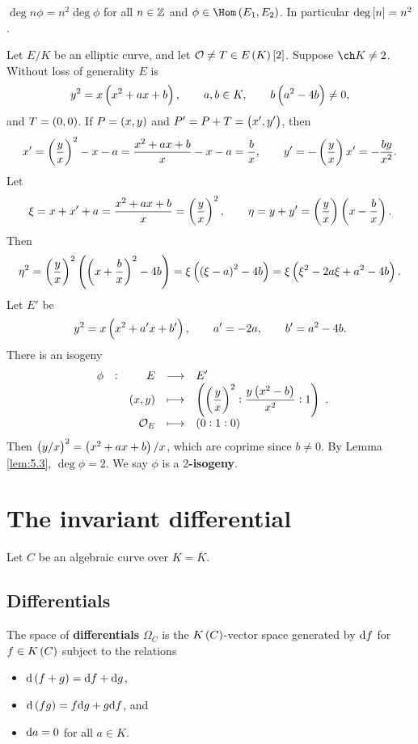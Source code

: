 \begin{corollary}
\label{cor:5.8}
$ \deg n\phi = n^2\deg \phi $ for all $ n \in \mathbb{Z} $ and $ \phi \in \Hom\br{E_1, E_2} $. In particular $ \deg \sbr{n} = n^2 $.
\end{corollary}

\pagebreak

\begin{example}
Let $ E / K $ be an elliptic curve, and let $ \OOO \ne T \in E\br{K}\sbr{2} $. Suppose $ \ch K \ne 2 $. Without loss of generality $ E $ is
$$ y^2 = x\br{x^2 + ax + b}, \qquad a, b \in K, \qquad b\br{a^2 - 4b} \ne 0, $$
and $ T = \br{0, 0} $. If $ P = \br{x, y} $ and $ P' = P + T = \br{x', y'} $, then
$$ x' = \br{\dfrac{y}{x}}^2 - x - a = \dfrac{x^2 + ax + b}{x} - x - a = \dfrac{b}{x}, \qquad y' = -\br{\dfrac{y}{x}}x' = -\dfrac{by}{x^2}. $$
Let
$$ \xi = x + x' + a = \dfrac{x^2 + ax + b}{x} = \br{\dfrac{y}{x}}^2, \qquad \eta = y + y' = \br{\dfrac{y}{x}}\br{x - \dfrac{b}{x}}. $$
Then
$$ \eta^2 = \br{\dfrac{y}{x}}^2\br{\br{x + \dfrac{b}{x}}^2 - 4b} = \xi\br{\br{\xi - a}^2 - 4b} = \xi\br{\xi^2 - 2a\xi + a^2 - 4b}. $$
Let $ E' $ be
$$ y^2 = x\br{x^2 + a'x + b'}, \qquad a' = -2a, \qquad b' = a^2 - 4b. $$
There is an isogeny
$$ \functions[\phi]{E}{E'}{\br{x, y}}{\br{\br{\dfrac{y}{x}}^2 : \dfrac{y\br{x^2 - b}}{x^2} : 1}}{\OOO_E}{\br{0 : 1 : 0}}. $$
Then $ \br{y / x}^2 = \br{x^2 + ax + b} / x $, which are coprime since $ b \ne 0 $. By Lemma \ref{lem:5.3}, $ \deg \phi = 2 $. We say $ \phi $ is a \textbf{$ 2 $-isogeny}.
\end{example}

\pagebreak

\section{The invariant differential}


Let $ C $ be an algebraic curve over $ K = \overline{K} $.

\subsection{Differentials}

\begin{definition*}
The space of \textbf{differentials} $ \Omega_C $ is the $ K\br{C} $-vector space generated by $ \mathrm{d} f $ for $ f \in K\br{C} $ subject to the relations
\begin{itemize}
\item $ \d\br{f + g} = \d f + \d g $,
\item $ \d\br{fg} = f\d g + g\d f $, and
\item $ \mathrm{d} a = 0 $ for all $ a \in K $.
\end{itemize}
\end{definition*}

